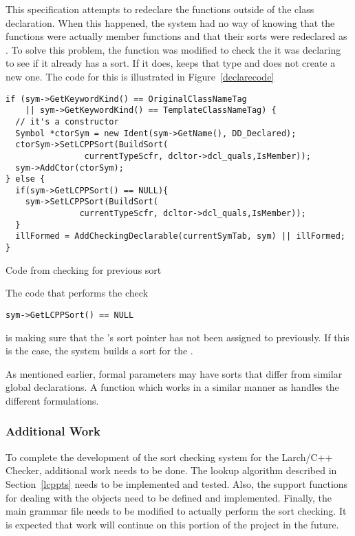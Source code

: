 This specification attempts to redeclare the functions outside of the
class declaration. When this happened, the system had no way of
knowing that the functions were actually member functions and that their sorts
were redeclared as . To solve this problem,
the  function was modified to check the  it
was declaring to see if it already has a sort. If it does,
 keeps that type and does not create a new one. The
code for this is illustrated in Figure~\ref{declarecode}

\begin{BFIGURE}
\begin{verbatim}
if (sym->GetKeywordKind() == OriginalClassNameTag
    || sym->GetKeywordKind() == TemplateClassNameTag) {
  // it's a constructor
  Symbol *ctorSym = new Ident(sym->GetName(), DD_Declared);
  ctorSym->SetLCPPSort(BuildSort(
                currentTypeScfr, dcltor->dcl_quals,IsMember));
  sym->AddCtor(ctorSym);
} else {
  if(sym->GetLCPPSort() == NULL){
    sym->SetLCPPSort(BuildSort(
               currentTypeScfr, dcltor->dcl_quals,IsMember));
  }
  illFormed = AddCheckingDeclarable(currentSymTab, sym) || illFormed;
}
\end{verbatim}
\caption{Code from  checking for previous sort}
\label{declarecode}
\end{BFIGURE} 
The code that performs the check
\begin{verbatim}
sym->GetLCPPSort() == NULL
\end{verbatim}
is making sure that the 's sort pointer has not
been assigned to previously. If this is the case, the system builds a
sort for the  .

As mentioned earlier, formal parameters may have sorts that differ from
similar global declarations. A function  which
works in a similar manner as  handles the
different formulations.

\subsubsection{Additional Work}

To complete the development of the sort checking system for the
Larch/C++ Checker, additional work needs to be done. The lookup
algorithm described in Section~\ref{lcppts} needs to be implemented
and tested. Also, the support functions for dealing with the
 objects need to be defined and
implemented. Finally, the main grammar file needs to be modified to
actually perform the sort checking. It is expected that work will
continue on this portion of the project in the future.


